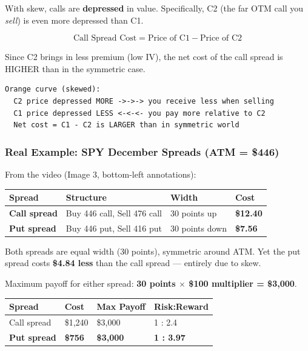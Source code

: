 \documentclass[12pt,openany]{book}
\begin{document}
With skew, calls are \textbf{depressed} in value. Specifically, C2 (the far OTM call you \emph{sell}) is even more depressed than C1.

\[
\text{Call Spread Cost} = \text{Price of C1} - \text{Price of C2}
\]

Since C2 brings in less premium (low IV), the net cost of the call spread is HIGHER than in the symmetric case.

\begin{center}
\begin{Verbatim}[fontsize=\small,breaklines=true]
Orange curve (skewed):
  C2 price depressed MORE ->->-> you receive less when selling
  C1 price depressed LESS <-<-<- you pay more relative to C2
  Net cost = C1 - C2 is LARGER than in symmetric world
\end{Verbatim}
\end{center}

\subsubsection{Real Example: SPY December Spreads (ATM = \$446)}

From the video (Image 3, bottom-left annotations):

\begin{center}
\scriptsize
\setlength{\tabcolsep}{3pt}
\begin{tabular}{|L{3.0cm}|L{3.0cm}|L{3.0cm}|L{3.0cm}|}
\hline
\textbf{Spread} & \textbf{Structure} & \textbf{Width} & \textbf{Cost} \\
\hline
\textbf{Call spread} & Buy 446 call, Sell 476 call & 30 points up & \textbf{\$12.40} \\
\hline
\textbf{Put spread} & Buy 446 put, Sell 416 put & 30 points down & \textbf{\$7.56} \\
\hline
\end{tabular}
\end{center}

Both spreads are equal width (30 points), symmetric around ATM. Yet the put spread costs \textbf{\$4.84 less} than the call spread — entirely due to skew.

Maximum payoff for either spread: \textbf{30 points \(\times\) \$100 multiplier = \$3,000}.

\begin{center}
\scriptsize
\setlength{\tabcolsep}{3pt}
\begin{tabular}{|L{3.0cm}|L{3.0cm}|L{3.0cm}|L{3.0cm}|}
\hline
\textbf{Spread} & \textbf{Cost} & \textbf{Max Payoff} & \textbf{Risk:Reward} \\
\hline
Call spread & \$1,240 & \$3,000 & 1 : 2.4 \\
\hline
\textbf{Put spread} & \textbf{\$756} & \textbf{\$3,000} & \textbf{1 : 3.97} \\
\hline
\end{tabular}
\end{center}
\end{document}
